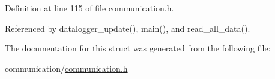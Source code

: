 Definition at line 115 of file communication.\-h.



Referenced by datalogger\-\_\-update(), main(), and read\-\_\-all\-\_\-data().



The documentation for this struct was generated from the following file\-:\begin{DoxyCompactItemize}
\item 
communication/\hyperlink{communication_2communication_8h}{communication.\-h}\end{DoxyCompactItemize}
